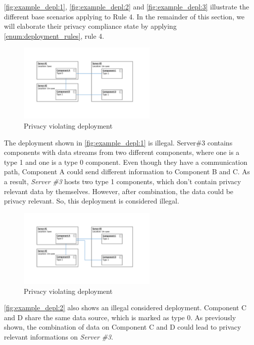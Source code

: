 \autoref{fig:example_depl:1}, \autoref{fig:example_depl:2} and \autoref{fig:example_depl:3} illustrate the different base scenarios applying to Rule 4. In the remainder of this section, we will elaborate their privacy compliance state by applying \autoref{enum:deployment_rules}, rule 4.

\begin{figure}[h]
	\centering
	\includegraphics[trim = 35mm 45mm 40mm 30mm, clip, width=0.6\textwidth]{graphs/deployment_example_1}
	\caption{Privacy violating deployment}
	\label{fig:example_depl:1}
\end{figure}

The deployment shown in \autoref{fig:example_depl:1} is illegal. Server\#3 contains components with data streams from two different components, where one is a type 1 and one is a type 0 component. Even though they have a communication path, Component A could send different information to Component B and C. As a result, \textit{Server \#3} hosts two type 1 components, which don't contain privacy relevant data by themselves. However, after combination, the data could be privacy relevant. So, this deployment is considered illegal.

\begin{figure}[h]
	\centering
	\includegraphics[trim = 35mm 45mm 40mm 30mm, clip, width=0.6\textwidth]{graphs/deployment_example_2}
	\caption{Privacy violating deployment}
	\label{fig:example_depl:2}
\end{figure}

\autoref{fig:example_depl:2} also shows an illegal considered deployment. Component C and D share the same data source, which is marked as type 0. As previously shown, the combination of data on Component C and D could lead to privacy relevant informations on \textit{Server \#3}.


